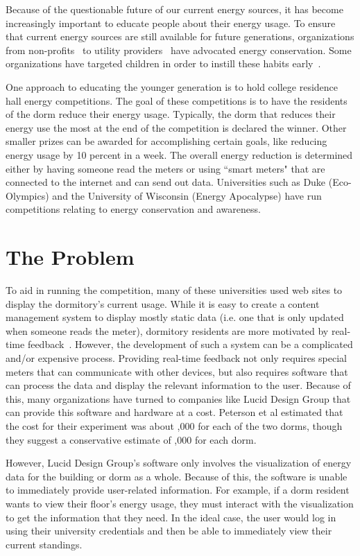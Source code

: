 Because of the questionable future of our current energy sources, it has become increasingly important to educate people about their energy usage.  To ensure that current energy sources are still available for future generations, organizations from non-profits~\cite{blueplanet} to utility providers~\cite{heco} have advocated energy conservation.  Some organizations have targeted children in order to instill these habits early~\cite{energyhog}.

One approach to educating the younger generation is to hold college residence hall energy competitions.  The goal of these competitions is to have the residents of the dorm reduce their energy usage.  Typically, the dorm that reduces their energy use the most at the end of the competition is declared the winner.  Other smaller prizes can be awarded for accomplishing certain goals, like reducing energy usage by 10 percent in a week.  The overall energy reduction is determined either by having someone read the meters or using ``smart meters" that are connected to the internet and can send out data.  Universities such as Duke (Eco-Olympics) and the University of Wisconsin (Energy Apocalypse) have run competitions relating to energy conservation and awareness. 

\section{The Problem}

To aid in running the competition, many of these universities used web sites to display the dormitory's current usage.  While it is easy to create a content management system to display mostly static data (i.e. one that is only updated when someone reads the meter), dormitory residents are more motivated by real-time feedback~\cite{oberlin-feedback}.  However, the development of such a system can be a complicated and/or expensive process.  Providing real-time feedback not only requires special meters that can communicate with other devices, but also requires software that can process the data and display the relevant information to the user.  Because of this, many organizations have turned to companies like Lucid Design Group that can provide this software and hardware at a cost.  Peterson et al estimated that the cost for their experiment was about ,000 for each of the two dorms, though they suggest a conservative estimate of ,000 for each dorm.

However, Lucid Design Group's software only involves the visualization of energy data for the building or dorm as a whole.  Because of this, the software is unable to immediately provide user-related information.  For example, if a dorm resident wants to view their floor's energy usage, they must interact with the visualization to get the information that they need.  In the ideal case, the user would log in using their university credentials and then be able to immediately view their current standings.

